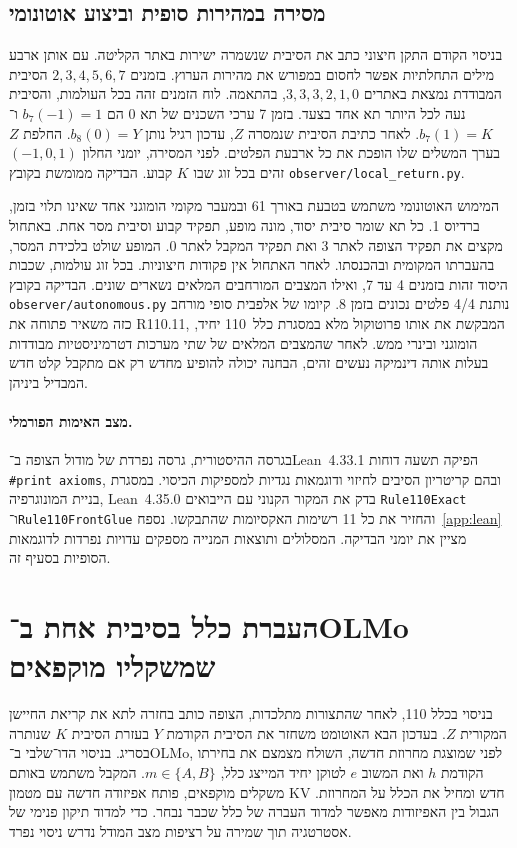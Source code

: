 \documentclass[11pt,a4paper]{article}
\DeclareRobustCommand{\textenglish}[1]{\foreignlanguage{english}{#1}}
\theoremstyle{definition}
\begin{document}
\subsection{מסירה במהירות סופית וביצוע אוטונומי}

בניסוי הקודם התקן חיצוני כתב את הסיבית שנשמרה ישירות באתר הקליטה. עם אותן ארבע מילים התחלתיות אפשר לחסום במפורש את מהירות הערוץ. בזמנים $2,3,4,5,6,7$ הסיבית המבודדת נמצאת באתרים $3,3,3,2,1,0$, בהתאמה. לוח הזמנים זהה בכל העולמות, והסיבית נעה לכל היותר תא אחד בצעד. בזמן 7 ערכי השכנים של תא $0$ הם $b_7(-1)=1$ ו־$b_7(1)=K$. לאחר כתיבת הסיבית שנמסרה $Z$, עדכון רגיל נותן $b_8(0)=Y$. החלפת $Z$ בערך המשלים שלו הופכת את כל ארבעת הפלטים. לפני המסירה, יומני החלון $(-1,0,1)$ זהים בכל זוג שבו $K$ קבוע. הבדיקה ממומשת בקובץ \textenglish{\nolinkurl{observer/local_return.py}}.

המימוש האוטונומי משתמש בטבעת באורך 61 ובמעבר מקומי הומוגני אחד שאינו תלוי בזמן, ברדיוס 1. כל תא שומר סיבית יסוד, מונה מופע, תפקיד קבוע וסיבית מסר אחת. באתחול מקצים את תפקיד הצופה לאתר 3 ואת תפקיד המקבל לאתר 0. המופע שולט בלכידת המסר, בהעברתו המקומית ובהכנסתו. לאחר האתחול אין פקודות חיצוניות. בכל זוג עולמות, שכבות היסוד זהות בזמנים 4 עד 7, ואילו המצבים המורחבים המלאים נשארים שונים. הבדיקה בקובץ \textenglish{\nolinkurl{observer/autonomous.py}} נותנת 4/4 פלטים נכונים בזמן 8. קיומו של אלפבית סופי מורחב כזה משאיר פתוחה את \textenglish{R110.11}, המבקשת את אותו פרוטוקול מלא במסגרת כלל~110 יחיד, הומוגני ובינרי ממש. לאחר שהמצבים המלאים של שתי מערכות דטרמיניסטיות מבודדות בעלות אותה דינמיקה נעשים זהים, הבחנה יכולה להופיע מחדש רק אם מתקבל קלט חדש המבדיל ביניהן.

\paragraph{מצב האימות הפורמלי.}
בגרסה ההיסטורית, גרסה נפרדת של מודול הצופה ב־\textenglish{Lean~4.33.1} הפיקה תשעה דוחות \textenglish{\texttt{\#print axioms}}, ובהם קריטריון הסיבים לחיזוי ודוגמאות נגדיות למספיקות הכיסוי. במסגרת בניית המונוגרפיה, \textenglish{Lean~4.35.0} בדק את המקור הקנוני עם הייבואים \textenglish{\texttt{Rule110Exact}} ו־\textenglish{\texttt{Rule110FrontGlue}} והחזיר את כל 11 רשימות האקסיומות שהתבקשו. נספח~\ref{app:lean} מציין את יומני הבדיקה. המסלולים ותוצאות המנייה מספקים עדויות נפרדות לדוגמאות הסופיות בסעיף זה.

\section{העברת כלל בסיבית אחת ב־\textenglish{OLMo} שמשקליו מוקפאים}
\label{sec:olmo}
בניסוי בכלל 110, לאחר שהתצורות מתלכדות, הצופה כותב בחזרה לתא את קריאת החיישן המקורית $Z$. בעדכון הבא האוטומט משחזר את הסיבית הקודמת $Y$ בעזרת הסיבית $K$ שנותרה בסריג. בניסוי הדו־שלבי ב־\textenglish{OLMo}, לפני שמוצגת מחרוזת חדשה, השולח מצמצם את בחירתו הקודמת $h$ ואת המשוב $e$ לטוקן יחיד המייצג כלל, $m\in\{A,B\}$. המקבל משתמש באותם משקלים מוקפאים, פותח אפיזודה חדשה עם מטמון \textenglish{KV} חדש ומחיל את הכלל על המחרוזת. הגבול בין האפיזודות מאפשר למדוד העברה של כלל שכבר נבחר. כדי למדוד תיקון פנימי של אסטרטגיה תוך שמירה על רציפות מצב המודל נדרש ניסוי נפרד.
\end{document}
